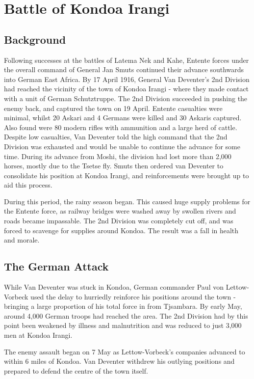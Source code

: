 \documentclass[a4paper,]{book}
\begin{document}
\section{Battle of Kondoa Irangi}

\subsection{Background}

Following successes at the battles of Latema Nek and Kahe, Entente forces under the overall command of General Jan Smuts continued their advance southwards into German East Africa. By 17 April 1916, General Van Deventer's 2nd Division had reached the vicinity of the town of Kondoa Irangi - where they made contact with a unit of German Schutztruppe. The 2nd Division succeeded in pushing the enemy back, and captured the town on 19 April. Entente casualties were minimal, whilst 20 Askari and 4 Germans were killed and 30 Askaris captured. Also found were 80 modern rifles with ammunition and a large herd of cattle. Despite low casualties, Van Deventer told the high command that the 2nd Division was exhausted and would be unable to continue the advance for some time. During its advance from Moshi, the division had lost more than 2,000 horses, mostly due to the Tsetse fly. Smuts then ordered van Deventer to consolidate his position at Kondoa Irangi, and reinforcements were brought up to aid this process.

During this period, the rainy season began. This caused huge supply problems for the Entente force, as railway bridges were washed away by swollen rivers and roads became impassable. The 2nd Division was completely cut off, and was forced to scavenge for supplies around Kondoa. The result was a fall in health and morale. 

\subsection{The German Attack}

While Van Deventer was stuck in Kondoa, German commander Paul von Lettow-Vorbeck used the delay to hurriedly reinforce his positions around the town - bringing a large proportion of his total force in from Tjsambara. By early May, around 4,000 German troops had reached the area. The 2nd Division had by this point been weakened by illness and malnutrition and was reduced to just 3,000 men at Kondoa Irangi.

The enemy assault began on 7 May as Lettow-Vorbeck's companies advanced to within 6 miles of Kondoa. Van Deventer withdrew his outlying positions and prepared to defend the centre of the town itself.
\end{document}
